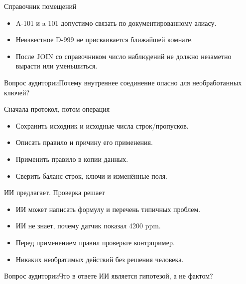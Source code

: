\documentclass[aspectratio=169,10pt]{beamer}
\begin{document}
\begin{frame}[t]{Справочник помещений}
\begin{itemize}
\item A-101 и a 101 допустимо связать по документированному алиасу.
\vspace{4pt}
\item Неизвестное D-999 не присваивается ближайшей комнате.
\vspace{4pt}
\item После JOIN со справочником число наблюдений не должно незаметно вырасти или уменьшиться.
\vspace{4pt}
\end{itemize}
\vfill\begin{alertblock}{Вопрос аудитории}Почему внутреннее соединение опасно для необработанных ключей?\end{alertblock}
\end{frame}
\begin{frame}[t]{Сначала протокол, потом операция}
\begin{itemize}
\item Сохранить исходник и исходные числа строк/пропусков.
\vspace{4pt}
\item Описать правило и причину его применения.
\vspace{4pt}
\item Применить правило в копии данных.
\vspace{4pt}
\item Сверить баланс строк, ключи и изменённые поля.
\vspace{4pt}
\end{itemize}
\end{frame}
\begin{frame}[t]{ИИ предлагает. Проверка решает}
\begin{itemize}
\item ИИ может написать формулу и перечень типичных проблем.
\vspace{4pt}
\item ИИ не знает, почему датчик показал 4200 ppm.
\vspace{4pt}
\item Перед применением правил проверьте контрпример.
\vspace{4pt}
\item Никаких необратимых действий без решения человека.
\vspace{4pt}
\end{itemize}
\vfill\begin{alertblock}{Вопрос аудитории}Что в ответе ИИ является гипотезой, а не фактом?\end{alertblock}
\end{frame}
\end{document}
